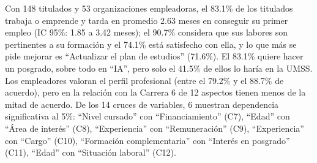 Con 148 titulados y 53 organizaciones empleadoras, el 83.1\% de los titulados trabaja o emprende y tarda en promedio 2.63 meses en conseguir su primer empleo (IC 95\%: 1.85 a 3.42 meses); el 90.7\% considera que sus labores son pertinentes a su formación y el 74.1\% está satisfecho con ella, y lo que más se pide mejorar es ``Actualizar el plan de estudios'' (71.6\%). El 83.1\% quiere hacer un posgrado, sobre todo en ``IA'', pero solo el 41.5\% de ellos lo haría en la UMSS. Los empleadores valoran el perfil profesional (entre el 79.2\% y el 88.7\% de acuerdo), pero en la relación con la Carrera 6 de 12 aspectos tienen menos de la mitad de acuerdo. De los 14 cruces de variables, 6 muestran dependencia significativa al 5\%: ``Nivel cursado'' con ``Financiamiento'' (C7), ``Edad'' con ``Área de interés'' (C8), ``Experiencia'' con ``Remuneración'' (C9), ``Experiencia'' con ``Cargo'' (C10), ``Formación complementaria'' con ``Interés en posgrado'' (C11), ``Edad'' con ``Situación laboral'' (C12).